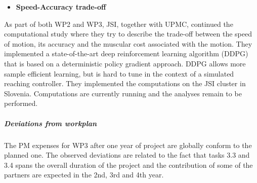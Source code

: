 \begin{itemize}
\item \textbf{Speed-Accuracy trade-off}
\end{itemize}
As part of both WP2 and WP3, JSI, together with UPMC, continued the computational study where they try to describe the trade-off between the speed of motion, its accuracy and the muscular cost associated with the motion. They implemented a state-of-the-art deep reinforcement learning algorithm (DDPG) that is based on a deterministic policy gradient approach. DDPG allows more sample efficient learning, but is hard to tune in the context of a simulated reaching controller. They implemented the computations on the JSI cluster in Slovenia. Computations are currently running and the analyses remain to be performed.
    
\subparagraph{Deviations from workplan}  

The PM expenses for WP3 after one year of project are globally conform to the planned one. The observed deviations are related to the fact that tasks 3.3 and 3.4 spans the overall duration of the project and the contribution of some of the partners are expected in the 2nd, 3rd and 4th year.





